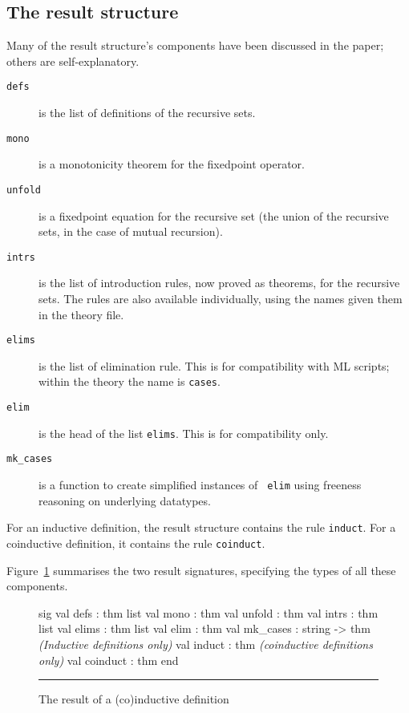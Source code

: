 \subsection{The result structure}
Many of the result structure's components have been discussed in the paper;
others are self-explanatory.
\begin{description}
\item[\tt defs] is the list of definitions of the recursive sets.

\item[\tt mono] is a monotonicity theorem for the fixedpoint operator.

\item[\tt unfold] is a fixedpoint equation for the recursive set (the union of
the recursive sets, in the case of mutual recursion).

\item[\tt intrs] is the list of introduction rules, now proved as theorems, for
the recursive sets.  The rules are also available individually, using the
names given them in the theory file. 

\item[\tt elims] is the list of elimination rule.  This is for compatibility
  with ML scripts; within the theory the name is \texttt{cases}.
  
\item[\tt elim] is the head of the list \texttt{elims}.  This is for
  compatibility only.
  
\item[\tt mk_cases] is a function to create simplified instances of {\tt
elim} using freeness reasoning on underlying datatypes.
\end{description}

For an inductive definition, the result structure contains the
rule \texttt{induct}.  For a
coinductive definition, it contains the rule \verb|coinduct|.

Figure~\ref{def-result-fig} summarises the two result signatures,
specifying the types of all these components.

\begin{figure}
\begin{ttbox}
sig
val defs         : thm list
val mono         : thm
val unfold       : thm
val intrs        : thm list
val elims        : thm list
val elim         : thm
val mk_cases     : string -> thm
{\it(Inductive definitions only)} 
val induct       : thm
{\it(coinductive definitions only)}
val coinduct     : thm
end
\end{ttbox}
\hrule
\caption{The {\ML} result of a (co)inductive definition} \label{def-result-fig}
\end{figure}

